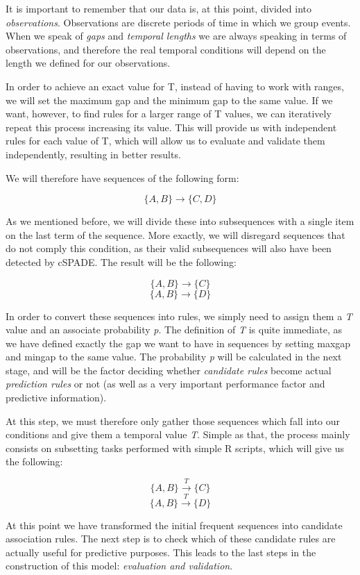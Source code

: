 It is important to remember that our data is, at this point, divided into \emph{observations}. Observations are discrete periods of time in which we group events. When we speak of \emph{gaps} and \emph{temporal lengths} we are always speaking in terms of observations, and therefore the real temporal conditions will depend on the length we defined for our observations.

In order to achieve an exact value for T, instead of having to work with ranges, we will set the maximum gap and the minimum gap to the same value. If we want, however, to find rules for a larger range of T values, we can iteratively repeat this process increasing its value. This will provide us with independent rules for each value of T, which will allow us to evaluate and validate them independently, resulting in better results. 

We will therefore have sequences of the following form:

$$\{A, B\} \longrightarrow \{C, D\}$$

As we mentioned before, we will divide these into subsequences with a single item on the last term of the sequence. More exactly, we will disregard sequences that do not comply this condition, as their valid subsequences will also have been detected by cSPADE. The result will be the following:

$$\{A, B\} \longrightarrow \{C\}$$
$$\{A, B\} \longrightarrow \{D\}$$

In order to convert these sequences into rules, we simply need to assign them a \emph{T} value and an associate probability \emph{p}. The definition of \emph{T} is quite immediate, as we have defined exactly the gap we want to have in sequences by setting maxgap and mingap to the same value. The probability \emph{p} will be calculated in the next stage, and will be the factor deciding whether \emph{candidate rules} become actual \emph{prediction rules} or not (as well as a very important performance factor and predictive information).

At this step, we must therefore only gather those sequences which fall into our conditions and give them a temporal value \emph{T}. Simple as that, the process mainly consists on subsetting tasks performed with simple R scripts, which will give us the following:

$$\{A, B\} \xrightarrow{T} \{C\}$$
$$\{A, B\} \xrightarrow{T} \{D\}$$

At this point we have transformed the initial frequent sequences into candidate association rules. The next step is to check which of these candidate rules are actually useful for predictive purposes. This leads to the last steps in the construction of this model: \emph{evaluation and validation}.


